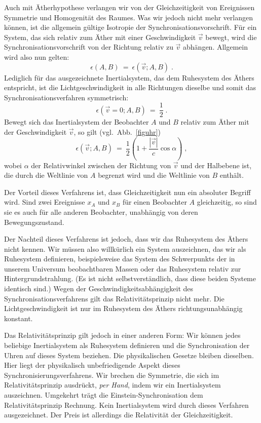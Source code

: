 Auch mit \"Atherhypothese verlangen wir von der Gleichzeitigkeit von
Ereignissen Symmetrie und Homogenit\"at des Raumes. Was wir jedoch
nicht mehr verlangen k\"onnen, ist die allgemein g\"ultige Isotropie
der Synchronisationsvorschrift. F\"ur ein System, das sich relativ zum
\"Ather mit einer Geschwindigkeit $\vec{v}$ bewegt, wird die
Synchronisationsvorschrift von der Richtung relativ zu $\vec{v}$
abh\"angen. Allgemein wird also nun gelten:
\[         \epsilon(A,B) ~=~ \epsilon(\vec{v};A,B)   \;.   \]
Lediglich f\"ur das ausgezeichnete Inertialsystem, das dem
Ruhesystem des \"Athers entspricht, ist die Lichtgeschwindigkeit in
alle Richtungen dieselbe und somit das Synchronisationsverfahren
symmetrisch:
\[       \epsilon(\vec{v}=0;A,B) ~=~ \frac{1}{2}   \;.   \]
Bewegt sich das Inertialsystem der Beobachter $A$ und $B$ relativ
zum \"Ather mit der Geschwindigkeit $\vec{v}$, so gilt 
(vgl.\ Abb.~\ref{figuhr})
\[      \epsilon(\vec{v};A,B) ~=~ \frac{1}{2} 
        \left( 1 + \frac{|\vec{v}|}{c}\cos \alpha \right)  \;, \]
wobei $\alpha$ der Relativwinkel zwischen der Richtung von $\vec{v}$
und der Halbebene ist, die durch die Weltlinie
von $A$ begrenzt wird und die Weltlinie von $B$ enth\"alt.

Der Vorteil dieses Verfahrens ist, dass Gleichzeitigkeit nun
ein absoluter Begriff wird. Sind zwei Ereignisse $x_A$ und $x_B$
f\"ur einen Beobachter $A$ gleichzeitig, so sind sie es auch f\"ur
alle anderen Beobachter, unabh\"angig von deren Bewegungszustand.
 
Der Nachteil dieses Verfahrens ist jedoch, dass wir das Ruhesystem
des \"Athers nicht kennen. Wir m\"ussen also willk\"urlich ein System
auszeichnen, das wir als Ruhesys\-tem definieren, beispielsweise das
System des Schwerpunkts der in unserem Universum beobachtbaren Massen
oder das Ruhe\-sys\-tem relativ zur Hintergrundstrahlung. (Es ist nicht
selbstverst\"andlich, dass diese beiden Sys\-teme identisch sind.)
Wegen der Geschwindigkeitsabh\"angigkeit des Synchronisationsverfahrens
gilt das Relativit\"atsprinzip nicht mehr. Die Lichtgeschwindigkeit
ist nur im Ruhesystem des \"Athers richtungs\-un\-ab\-h\"angig konstant.

Das Relativit\"atsprinzip gilt jedoch in einer anderen Form:
Wir k\"onnen jedes beliebige Inertialsystem als Ruhesystem definieren
und die Synchronisation der Uhren auf dieses System beziehen. Die
physikalischen Gesetze bleiben dieselben. Hier liegt der physikalisch
unbefriedigende Aspekt dieses Synchronisierungsverfahrens. Wir brechen
die Symmetrie, die sich im Relativit\"atsprinzip ausdr\"uckt,
{\em per Hand}, indem wir ein Inertialsystem auszeichnen. Umgekehrt
tr\"agt die Einstein-Synchronisation dem Relativit\"atsprinzip Rechnung.
Kein Inertialsystem wird durch dieses Verfahren ausgezeichnet. Der
Preis ist allerdings die Relativit\"at der Gleichzeitigkeit.

